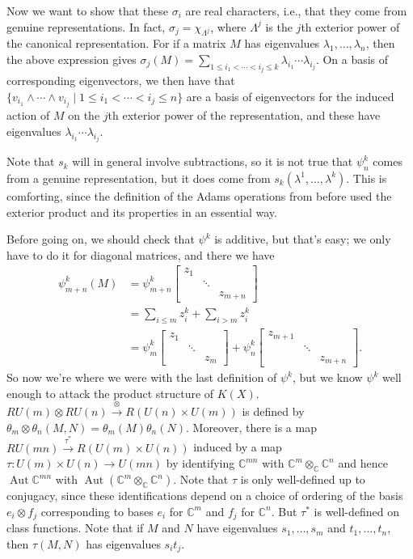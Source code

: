 \documentclass{article}
\newcommand{\C}{\mathbb{C}}
\DeclareMathOperator{\Aut}{Aut}
\begin{document}
Now we want to show that these $\sigma_i$ are real characters, i.e., that they come from genuine representations.  In fact, $\sigma_j = \chi_{\Lambda^j}$, where $\Lambda^j$ is the $j$th exterior power of the canonical representation.  For if a matrix $M$ has eigenvalues $\lambda_1, \ldots, \lambda_n$, then the above expression gives $\sigma_j(M) = \sum_{1 \le i_1 < \cdots < i_j \le k} \lambda_{i_1} \cdots \lambda_{i_j}$.  On a basis of corresponding eigenvectors, we then have that $\{v_{i_1} \wedge \cdots \wedge v_{i_j} \mid 1 \le i_1 < \cdots < i_j \le n\}$ are a basis of eigenvectors for the induced action of $M$ on the $j$th exterior power of the representation, and these have eigenvalues $\lambda_{i_1} \cdots \lambda_{i_j}$.

Note that $s_k$ will in general involve subtractions, so it is not true that $\psi^k_n$ comes from a genuine representation, but it does come from $s_k(\lambda^1, \ldots, \lambda^k)$.  This is comforting, since the definition of the Adams operations from before used the exterior product and its properties in an essential way.

Before going on, we should check that $\psi^k$ is additive, but that's easy; we only have to do it for diagonal matrices, and there we have
\begin{align*}
\psi^k_{m+n}(M) & = \psi^k_{m+n} \left[ \begin{array}{ccc} z_1 \\ & \ddots \\ & & z_{m+n}\end{array} \right] \\
& = \sum_{i \le m} z_i^k + \sum_{i > m} z_i^k \\
& = \psi^k_m \left[ \begin{array}{ccc} z_1 \\ & \ddots \\ & & z_m\end{array}\right] + \psi^k_n \left[ \begin{array}{ccc}z_{m+1} \\ & \ddots \\ & & z_{m+n} \end{array} \right].
\end{align*}
So now we're where we were with the last definition of $\psi^k$, but we know $\psi^k$ well enough to attack the product structure of $K(X)$.  $RU(m) \otimes RU(n) \stackrel{\otimes}{\to} R(U(n) \times U(m))$ is defined by $\theta_m \otimes \theta_n(M, N) = \theta_m(M) \theta_n(N)$.  Moreover, there is a map $RU(mn) \stackrel{\tau^*}{\to} R(U(m) \times U(n))$ induced by a map $\tau: U(m) \times U(n) \to U(mn)$ by identifying $\C^{mn}$ with $\C^m \otimes_\C \C^n$ and hence $\Aut \C^{mn}$ with $\Aut (\C^m \otimes_\C \C^n)$.  Note that $\tau$ is only well-defined up to conjugacy, since these identifications depend on a choice of ordering of the basis $e_i \otimes f_j$ corresponding to bases $e_i$ for $\C^m$ and $f_j$ for $\C^n$.  But $\tau^*$ is well-defined on class functions.  Note that if $M$ and $N$ have eigenvalues $s_1, \ldots, s_m$ and $t_1, \ldots, t_n$, then $\tau(M, N)$ has eigenvalues $s_i t_j$.
\end{document}
